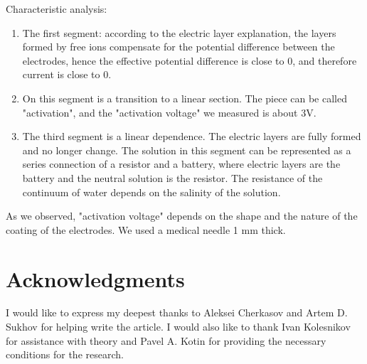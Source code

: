 \documentclass{article}
\begin{document}
Characteristic analysis:
\begin{enumerate}   
\item The first segment: according to the electric layer explanation, the layers formed by free ions compensate for the potential difference between the electrodes, hence the effective potential difference is close to 0, and therefore current is close to 0.

\item On this segment is a transition to a linear section. The piece can be called "activation", and the "activation voltage" we measured is about 3V.

\item The third segment is a linear dependence. The electric layers are fully formed and no longer change. The solution in this segment can be represented as a series connection of a resistor and a battery, where electric layers are the battery and the neutral solution is the resistor. The resistance of the continuum of water depends on the salinity of the solution.
\end{enumerate}

As we observed, "activation voltage" depends on the shape and the nature of the coating of the electrodes. We used a medical needle 1 mm thick.



\section{Acknowledgments}
I would like to express my deepest thanks to Aleksei Cherkasov and Artem D. Sukhov for helping write the article. I would also like to thank Ivan Kolesnikov for assistance with theory and Pavel A. Kotin for providing the necessary conditions for the research.



\end{document}
